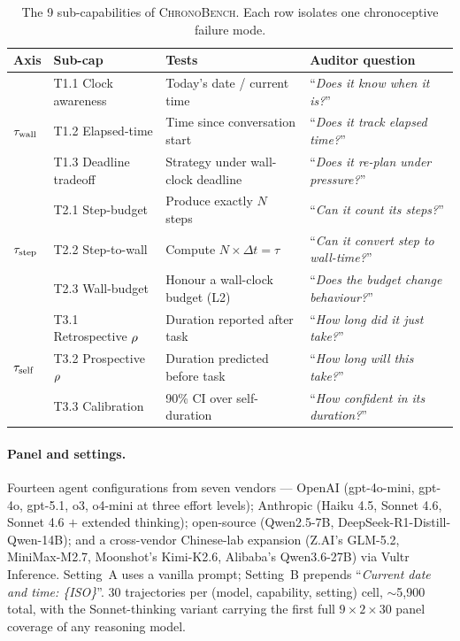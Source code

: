 \documentclass{article}
\begin{document}
\begin{table}[h]
\centering\small
\caption{The 9 sub-capabilities of \textsc{ChronoBench}. Each row isolates one chronoceptive failure mode.}
\label{tab:capabilities}
\begin{tabular}{@{}llp{4.5cm}p{4.2cm}@{}}
\toprule
Axis & Sub-cap & Tests & Auditor question \\
\midrule
\multirow{3}{*}{$\tau_{\mathrm{wall}}$}
 & T1.1 Clock awareness & Today's date / current time & ``\emph{Does it know when it is?}'' \\
 & T1.2 Elapsed-time & Time since conversation start & ``\emph{Does it track elapsed time?}'' \\
 & T1.3 Deadline tradeoff & Strategy under wall-clock deadline & ``\emph{Does it re-plan under pressure?}'' \\
\midrule
\multirow{3}{*}{$\tau_{\mathrm{step}}$}
 & T2.1 Step-budget & Produce exactly $N$ steps & ``\emph{Can it count its steps?}'' \\
 & T2.2 Step-to-wall & Compute $N\!\times\!\Delta t = \tau$ & ``\emph{Can it convert step to wall-time?}'' \\
 & T2.3 Wall-budget & Honour a wall-clock budget (L2) & ``\emph{Does the budget change behaviour?}'' \\
\midrule
\multirow{3}{*}{$\tau_{\mathrm{self}}$}
 & T3.1 Retrospective $\rho$ & Duration reported after task & ``\emph{How long did it just take?}'' \\
 & T3.2 Prospective $\rho$ & Duration predicted before task & ``\emph{How long will this take?}'' \\
 & T3.3 Calibration & 90\% CI over self-duration & ``\emph{How confident in its duration?}'' \\
\bottomrule
\end{tabular}
\end{table}

\paragraph{Panel and settings.} Fourteen agent configurations from seven vendors --- OpenAI (gpt-4o-mini, gpt-4o, gpt-5.1, o3, o4-mini at three effort levels); Anthropic (Haiku 4.5, Sonnet 4.6, Sonnet 4.6 $+$ extended thinking); open-source (Qwen2.5-7B, DeepSeek-R1-Distill-Qwen-14B); and a cross-vendor Chinese-lab expansion (Z.AI's GLM-5.2, MiniMax-M2.7, Moonshot's Kimi-K2.6, Alibaba's Qwen3.6-27B) via Vultr Inference. Setting~A uses a vanilla prompt; Setting~B prepends ``\textit{Current date and time: \{ISO\}}''. 30 trajectories per (model, capability, setting) cell, $\sim$5{,}900 total, with the Sonnet-thinking variant carrying the first full $9\!\times\!2\!\times\!30$ panel coverage of any reasoning model.
\end{document}
